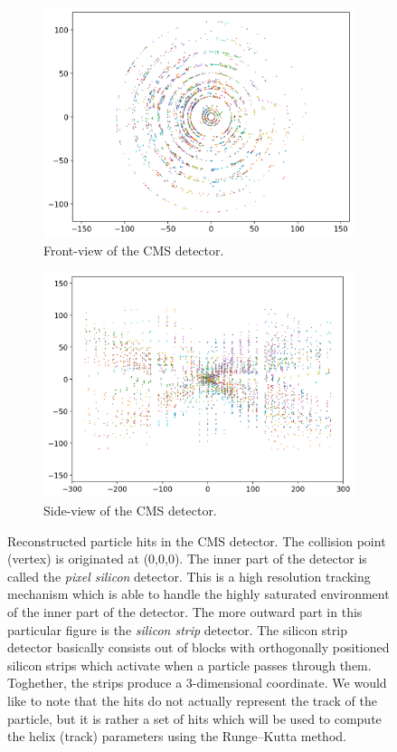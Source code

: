 \begin{figure}[H]
\centering
\begin{subfigure}{.5\textwidth}
  \centering
  \includegraphics[width=\linewidth]{resources/images/problem_statement_cms_front}
  \caption{Front-view of the CMS detector.}
  \label{fig:problem_statement_cms_front}
\end{subfigure}%
\begin{subfigure}{.5\textwidth}
  \centering
  \includegraphics[width=\linewidth]{resources/images/problem_statement_cms_side}
  \caption{Side-view of the CMS detector.}
  \label{fig:problem_statement_cms_side}
\end{subfigure}
\caption{Reconstructed particle hits in the CMS detector. The collision point (vertex) is originated at (0,0,0). The inner part of the detector is called the \emph{pixel silicon} detector. This is a high resolution tracking mechanism which is able to handle the highly saturated environment of the inner part of the detector. The more outward part in this particular figure is the \emph{silicon strip} detector. The silicon strip detector basically consists out of blocks with orthogonally positioned silicon strips which activate when a particle passes through them. Toghether, the strips produce a 3-dimensional coordinate. We would like to note that the hits do not actually represent the track of the particle, but it is rather a set of hits which will be used to compute the helix (track) parameters using the Runge–Kutta method.}

\end{figure}
